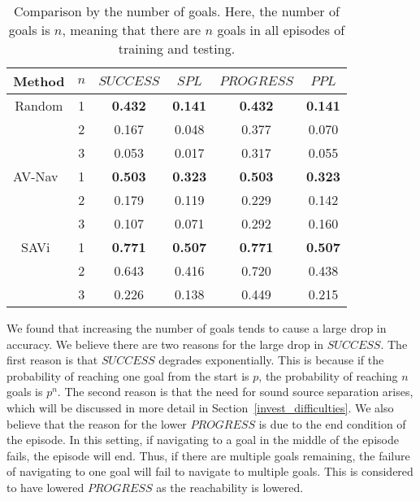 \begin{table}[tb]
    \setlength{\tabcolsep}{4pt}
    \centering
    \caption{
        Comparison by the number of goals.
        Here, the number of goals is $n$, meaning that there are $n$ goals in all episodes of training and testing.
    }
    \label{tab:n_goal_results}
    \begin{tabular}{@{}cccccc@{}}
    \toprule
        Method & $n$ & $SUCCESS$ & $SPL$ & $PROGRESS$ & $PPL$ \\ \midrule
        Random & 1 & \textbf{0.432} & \textbf{0.141} & \textbf{0.432} & \textbf{0.141} \\
        & 2 & 0.167 & 0.048 & 0.377 & 0.070 \\
        & 3 & 0.053 & 0.017 & 0.317 & 0.055 \\ \midrule
        AV-Nav~\cite{chen2020soundspaces} & 1 & \textbf{0.503} & \textbf{0.323} & \textbf{0.503} & \textbf{0.323} \\
        & 2 & 0.179 & 0.119 & 0.229 & 0.142 \\
        & 3 & 0.107 & 0.071 & 0.292 & 0.160 \\ \midrule
        SAVi~\cite{chen2021semantic} & 1 & \textbf{0.771} & \textbf{0.507} & \textbf{0.771} & \textbf{0.507} \\
        & 2 & 0.643 & 0.416 & 0.720 & 0.438 \\
        & 3 & 0.226 & 0.138 & 0.449 & 0.215 \\ \bottomrule
        \end{tabular}
\end{table}


We found that increasing the number of goals tends to cause a large drop in accuracy.
We believe there are two reasons for the large drop in $SUCCESS$.
The first reason is that $SUCCESS$ degrades exponentially.
This is because if the probability of reaching one goal from the start is $p$, the probability of reaching $n$ goals is $p^n$.
The second reason is that the need for sound source separation arises, which will be discussed in more detail in Section~\ref{invest_difficulties}.
We also believe that the reason for the lower $PROGRESS$ is due to the end condition of the episode.
In this setting, if navigating to a goal in the middle of the episode fails, the episode will end.
Thus, if there are multiple goals remaining, the failure of navigating to one goal will fail to navigate to multiple goals.
This is considered to have lowered $PROGRESS$ as the reachability is lowered.


